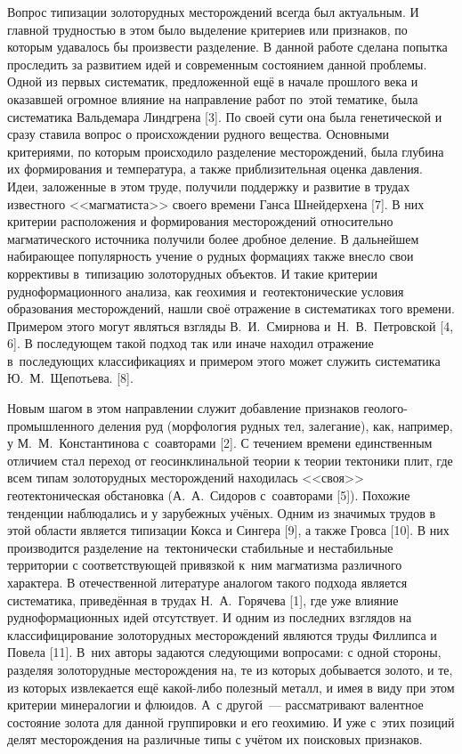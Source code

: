  

\makeProcTitle
{}

Вопрос типизации золоторудных месторождений всегда был актуальным. И главной трудностью в этом было выделение критериев или признаков, по которым удавалось бы произвести разделение. В данной работе сделана попытка проследить за развитием идей и современным состоянием данной проблемы. Одной из первых систематик, предложенной ещё в начале прошлого века и оказавшей огромное влияние на направление работ по~этой тематике, была систематика Вальдемара Линдгрена [3]. По своей сути она была генетической и сразу ставила вопрос о происхождении рудного вещества.  Основными критериями, по которым происходило разделение месторождений, была глубина их формирования и температура, а также приблизительная оценка давления. Идеи, заложенные в этом труде, получили поддержку и развитие в трудах известного <<магматиста>> своего времени Ганса Шнейдерхена [7]. В них критерии расположения и формирования месторождений относительно магматического источника получили более дробное деление.  В дальнейшем набирающее популярность учение о рудных формациях также внесло свои коррективы в~типизацию золоторудных объектов. И такие критерии рудноформационного анализа, как геохимия и~геотектонические условия образования месторождений, нашли своё отражение в систематиках того времени. Примером этого могут являться взгляды В.~И.~Смирнова и~Н.~В.~Петровской [4, 6]. В последующем такой подход так или иначе находил отражение в~последующих классификациях и примером этого может служить систематика Ю.~М.~Щепотьева. [8].

Новым шагом в этом направлении служит добавление признаков геолого-промышленного деления руд (морфология рудных тел, залегание), как, например, у М.~М.~Константинова с~соавторами [2]. С течением времени единственным отличием стал переход от геосинклинальной теории к теории тектоники плит, где всем типам золоторудных месторождений находилась <<своя>> геотектоническая обстановка (А.~А.~Сидоров с~соавторами [5]). Похожие тенденции наблюдались и у зарубежных учёных. Одним из значимых трудов в этой области является типизации Кокса и Сингера [9], а также Гровса [10]. В них производится разделение на~тектонически стабильные и нестабильные территории с соответствующей привязкой к~ним магматизма различного характера. В отечественной литературе аналогом такого подхода является систематика, приведённая в трудах Н.~А.~Горячева [1], где уже влияние рудноформационных идей отсутствует. И одним из последних взглядов на классифицирование золоторудных месторождений являются труды Филлипса и Повела [11]. В~них авторы задаются следующими вопросами: с одной стороны, разделяя золоторудные месторождения на, те из которых добывается золото, и те, из которых извлекается ещё какой-либо полезный металл, и имея в виду при этом критерии минералогии и флюидов. А~с другой~--- рассматривают валентное состояние золота для данной группировки и его геохимию. И уже с~этих позиций делят месторождения на различные типы с учётом их поисковых признаков.


